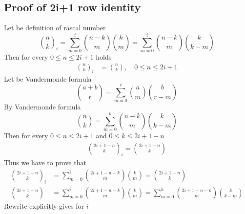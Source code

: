 \documentclass[12pt,letterpaper,oneside,reqno]{amsart}
\newcommand \rascalNumber [3] {\binom{#1}{#2}_{#3}}
\numberwithin{equation}{section}
\begin{document}
\subsection{Proof of 2i+1 row identity}
Let be definition of rascal number
\begin{equation*}
    \rascalNumber{n}{k}{i} = \sum_{m=0}^{i} \binom{n-k}{m} \binom{k}{m} = \sum_{m=0}^{i} \binom{n-k}{m} \binom{k}{k-m}
\end{equation*}
Then for every $0 \leq n \leq 2i+1$ holds
\begin{align}
    \rascalNumber{n}{k}{i}                  &= \binom{n}{k}, \quad 0 \leq n \leq 2i+1
\end{align}
Let be Vandermonde formula
\begin{equation*}
    \binom{a+b}{r} = \sum_{m=0}^{r} \binom{a}{m} \binom{b}{r-m}
\end{equation*}
By Vandermonde formula
\begin{equation*}
    \binom{n}{k} = \sum_{m=0}^{k} \binom{n-k}{m} \binom{k}{k-m}
\end{equation*}
Then for every $0 \leq n \leq 2i+1$ and $0 \leq k \leq 2i+1-n$
\begin{align*}
    \rascalNumber{2i+1-n}{k}{i} = \binom{2i+1-n}{k}
\end{align*}
Thus we have to prove that
\begin{align*}
    \rascalNumber{2i+1-n}{k}{i} &= \sum_{m=0}^{i} \binom{2i+1-n-k}{m} \binom{k}{m} = \binom{2i+1-n}{k} \\
    \binom{2i+1-n}{k}           &= \sum_{m=0}^{i} \binom{2i+1-n-k}{m} \binom{k}{m} = \sum_{m=0}^{k} \binom{2i+1-n-k}{m} \binom{k}{k-m}
\end{align*}
Rewrite explicitly gives for $i$
\end{document}

